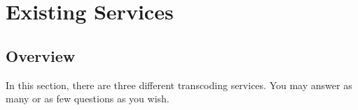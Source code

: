 \chapter{Existing Services}
\section{Overview}
In this section, there are three different transcoding services. You may answer as many or as few questions as you wish. 

\clearpage

\clearpage

\clearpage